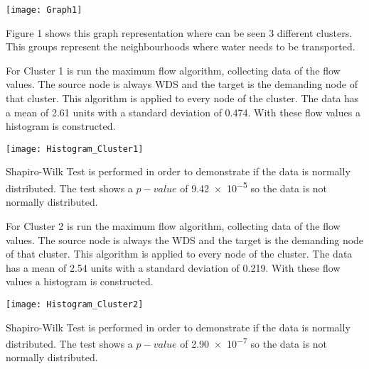 \documentclass[10pt,a4paper,openany]{article}
\begin{document}
		
	
	\begin{center}
		\texttt{[image: Graph1]}
	\end{center}
	
	Figure 1 shows this graph representation where can be seen 3 different clusters. This groups represent the neighbourhoods where water needs to be transported.
	
	For Cluster 1 is run the maximum flow algorithm, collecting data of the flow values. The source node is always WDS and the target is the demanding node of that cluster. This algorithm is applied to every node of the cluster. The data has a mean of 2.61 units with a standard deviation of 0.474. With these flow values a histogram is constructed.
	
	\begin{center}
		\texttt{[image: Histogram\_Cluster1]}
	\end{center}

\newpage

	Shapiro-Wilk Test is performed in order to demonstrate if the data is normally distributed. The test shows a $ p-value $ of \num{9.42e-5} so the data is not normally distributed.
	
		

	For Cluster 2 is run the maximum flow algorithm, collecting data of the flow values. The source node is always the WDS and the target is the demanding node of that cluster. This algorithm is applied to every node of the cluster. The data has a mean of 2.54 units with a standard deviation of 0.219. With these flow values a histogram is constructed.
	
	\begin{center}
		\texttt{[image: Histogram\_Cluster2]}
	\end{center}
	
	Shapiro-Wilk Test is performed in order to demonstrate if the data is normally distributed. The test shows a $ p-value $ of \num{2.90e-7} so the data is not normally distributed.
	
		
		
\end{document}
